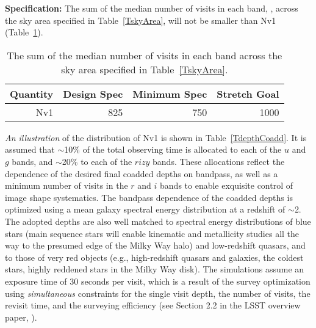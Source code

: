\textbf{Specification:} The sum of the median number of visits in each
band,
,
across the sky area specified in Table~\ref{TskyArea},
will not be smaller than Nv1 (Table~\ref{Nv1table}).
\begin{table}[h]
\begin{tabular}{|r|r|r|r|}
\hline
 Quantity            & Design Spec & Minimum Spec & Stretch Goal     \\
\hline
     Nv1             &   825   &   750     &    1000     \\
\hline
\end{tabular}
\caption{ The sum of the median number of visits in each
band across the sky area specified in Table~\ref{TskyArea}.}
\label{Nv1table}
\end{table}


\textit{An illustration}
of the distribution of Nv1 is shown in Table~\ref{TdepthCoadd}.
It is assumed that $\sim$10\% of the total observing time is allocated to
each of the $u$ and $g$ bands, and $\sim$20\% to each of the $rizy$ bands. These allocations
reflect the dependence of the desired final coadded depths on bandpass,
as well as a minimum number of visits in the $r$ and $i$ bands to enable
exquisite control of image shape systematics. The bandpass dependence of
the coadded depths is optimized using a mean galaxy spectral energy
distribution at a redshift of $\sim$2. The adopted
depths are also well matched to spectral energy distributions of blue stars
(main sequence stars will enable kinematic and
metallicity studies all the way to the presumed edge of the Milky Way halo)
and low-redshift quasars, and to those of very red objects (e.g., high-redshift
quasars and galaxies, the coldest stars, highly reddened stars in the Milky
Way disk). The simulations assume an exposure time of 30 seconds per visit,
which is a result of the survey optimization using \textit{simultaneous}
constraints for the single visit depth, the number of visits, the revisit
time, and the surveying efficiency (see Section 2.2 in the LSST overview
paper, \citep{2008arXiv0805.2366I}).


